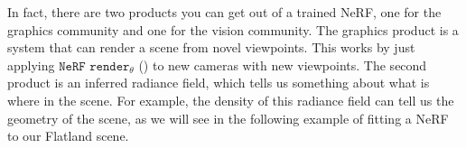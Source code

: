 In fact, there are two products you can get out of a trained NeRF, one for the graphics community and one for the vision community. The graphics product is a system that can render a scene from novel viewpoints. This works by just applying $\texttt{NeRF render}_{\theta}$ (\fig{\ref{fig:nerfs:full_nerf_pipeline}}) to new cameras with new viewpoints. The second product is an inferred radiance field, which tells us something about what is where in the scene. For example, the density of this radiance field can tell us the geometry of the scene, as we will see in the following example of fitting a NeRF to our Flatland scene.



